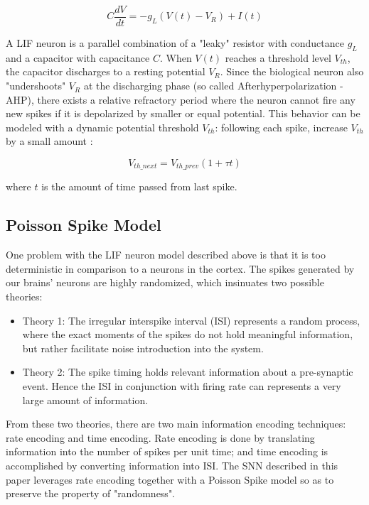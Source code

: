 \documentclass[11pt]{article}  %
\begin{document}
\begin{equation}
	C\frac{dV}{dt} = -g_L(V(t) - V_R) + I(t)
	\label{eq1}
\end{equation}

A LIF neuron is a parallel combination of a "leaky" resistor with conductance $g_L$ and a capacitor with capacitance $C$. When $V(t)$ reaches a threshold level $V_{th}$, the capacitor discharges to a resting potential $V_R$. Since the biological neuron also "undershoots" $V_R$ at the discharging phase (so called Afterhyperpolarization - AHP), there exists a relative refractory period where the neuron cannot fire any new spikes if it is depolarized by smaller or equal potential. This behavior can be modeled with a dynamic potential threshold $V_{th}$: following each spike, increase $V_{th}$ by a small amount \cite{b6}:

\begin{equation}
	V_{th\_next} = V_{th\_prev}(1+\tau t)
	\label{eq2}
\end{equation}

where $t$ is the amount of time passed from last spike. 

\subsection{Poisson Spike Model}

One problem with the LIF neuron model described above is that it is too deterministic in comparison to a neurons in the cortex. The spikes generated by our brains' neurons are highly randomized, which insinuates two possible theories:

\begin{itemize}
	\item Theory 1: The irregular interspike interval (ISI) represents a random process, where the exact moments of the spikes do not hold meaningful information, but rather facilitate noise introduction into the system.
	\item Theory 2: The spike timing holds relevant information about a pre-synaptic event. Hence the ISI in conjunction with firing rate can represents a very large amount of information.
\end{itemize}

From these two theories, there are two main information encoding techniques: rate encoding and time encoding. Rate encoding is done by translating information into the number of spikes per unit time; and time encoding is accomplished by converting information into ISI. The SNN described in this paper leverages rate encoding together with a Poisson Spike model so as to preserve the property of "randomness".
\end{document}
